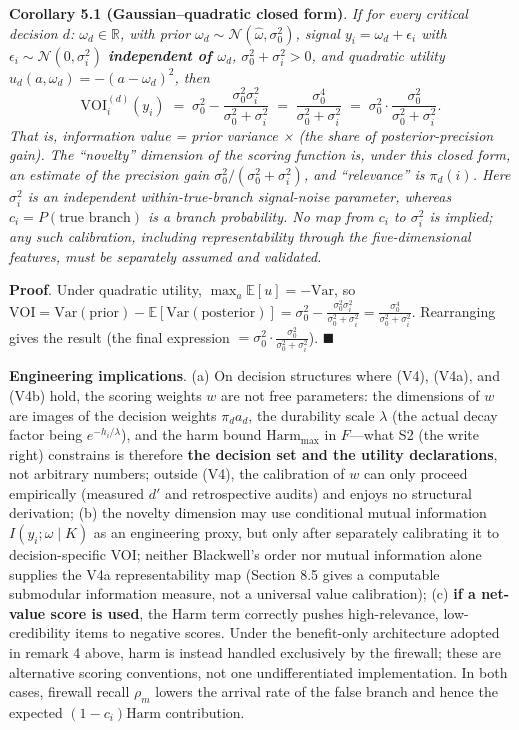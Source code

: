 \documentclass[
  11pt]{article}
\begin{document}
\textbf{Corollary 5.1 (Gaussian--quadratic closed form)}. \emph{If for
every critical decision \(d\): \(\omega_d \in \mathbb{R}\), with prior
\(\omega_d \sim \mathcal{N}(\hat\omega, \sigma_0^2)\), signal
\(y_i = \omega_d + \epsilon_i\) with
\(\epsilon_i \sim \mathcal{N}(0, \sigma_i^2)\) \textbf{independent of
\(\omega_d\)}, \(\sigma_0^2+\sigma_i^2>0\), and quadratic utility
\(u_d(a,\omega_d) = -(a - \omega_d)^2\), then}
\[\mathrm{VOI}_i^{(d)}(y_i) \;=\; \sigma_0^2 - \frac{\sigma_0^2 \sigma_i^2}{\sigma_0^2 + \sigma_i^2} \;=\; \frac{\sigma_0^4}{\sigma_0^2 + \sigma_i^2} \;=\; \sigma_0^2 \cdot \frac{\sigma_0^2}{\sigma_0^2 + \sigma_i^2}.\]
\emph{That is, information value = prior variance × (the share of
posterior-precision gain). The ``novelty'' dimension of the scoring
function is, under this closed form, an estimate of the precision gain
\(\sigma_0^2/(\sigma_0^2+\sigma_i^2)\), and ``relevance'' is
\(\pi_d(i)\). Here \(\sigma_i^2\) is an independent within-true-branch
signal-noise parameter, whereas \(c_i=P(\text{true branch})\) is a
branch probability. No map from \(c_i\) to \(\sigma_i^2\) is implied;
any such calibration, including representability through the
five-dimensional features, must be separately assumed and validated.}

\textbf{Proof}. Under quadratic utility,
\(\max_a \mathbb{E}[u] = -\mathrm{Var}\), so
\(\mathrm{VOI} = \mathrm{Var}(\text{prior}) - \mathbb{E}[\mathrm{Var}(\text{posterior})] = \sigma_0^2 - \frac{\sigma_0^2\sigma_i^2}{\sigma_0^2+\sigma_i^2} = \frac{\sigma_0^4}{\sigma_0^2 + \sigma_i^2}\).
Rearranging gives the result (the final expression
\(= \sigma_0^2 \cdot \frac{\sigma_0^2}{\sigma_0^2+\sigma_i^2}\)).
\(\blacksquare\)

\textbf{Engineering implications}. (a) On decision structures where
(V4), (V4a), and (V4b) hold, the scoring weights \(w\) are not free
parameters: the dimensions of \(w\) are images of the decision weights
\(\pi_d a_d\), the durability scale \(\lambda\) (the actual decay factor
being \(e^{-h_i/\lambda}\)), and the harm bound \(\mathrm{Harm}_{\max}\)
in \(F\)---what S2 (the write right) constrains is therefore \textbf{the
decision set and the utility declarations}, not arbitrary numbers;
outside (V4), the calibration of \(w\) can only proceed empirically
(measured \(d'\) and retrospective audits) and enjoys no structural
derivation; (b) the novelty dimension may use conditional mutual
information \(I(y_i; \omega \mid K)\) as an engineering proxy, but only
after separately calibrating it to decision-specific VOI; neither
Blackwell's order nor mutual information alone supplies the V4a
representability map (Section 8.5 gives a computable submodular
information measure, not a universal value calibration); (c) \textbf{if
a net-value score is used}, the \(\mathrm{Harm}\) term correctly pushes
high-relevance, low-credibility items to negative scores. Under the
benefit-only architecture adopted in remark 4 above, harm is instead
handled exclusively by the firewall; these are alternative scoring
conventions, not one undifferentiated implementation. In both cases,
firewall recall \(\rho_m\) lowers the arrival rate of the false branch
and hence the expected \((1-c_i)\mathrm{Harm}\) contribution.
\end{document}
